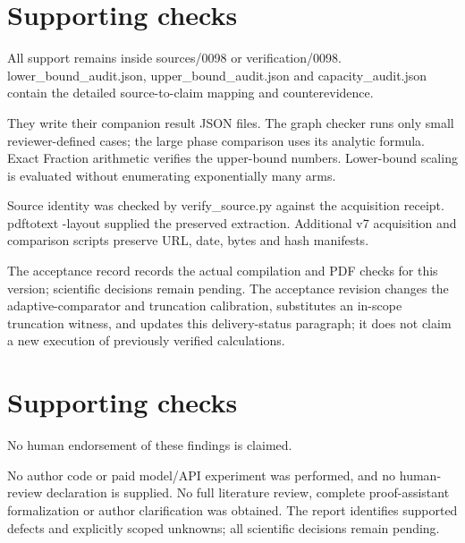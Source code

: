 \documentclass[10pt]{article}
\begin{document}
\section*{Supporting checks}
All support remains inside sources/0098 or verification/0098. lower\_bound\_audit.json, upper\_bound\_audit.json and capacity\_audit.json contain the detailed source-to-claim mapping and counterevidence.\par
They write their companion result JSON files. The graph checker runs only small reviewer-defined cases; the large phase comparison uses its analytic formula. Exact Fraction arithmetic verifies the upper-bound numbers. Lower-bound scaling is evaluated without enumerating exponentially many arms.\par
Source identity was checked by verify\_source.py against the acquisition receipt. pdftotext -layout supplied the preserved extraction. Additional v7 acquisition and comparison scripts preserve URL, date, bytes and hash manifests.\par
The acceptance record records the actual compilation and PDF checks for this version; scientific decisions remain pending. The acceptance revision changes the adaptive-comparator and truncation calibration, substitutes an in-scope truncation witness, and updates this delivery-status paragraph; it does not claim a new execution of previously verified calculations.\par
\section*{Supporting checks}
No human endorsement of these findings is claimed.\par
No author code or paid model/API experiment was performed, and no human-review declaration is supplied. No full literature review, complete proof-assistant formalization or author clarification was obtained. The report identifies supported defects and explicitly scoped unknowns; all scientific decisions remain pending.\par
\end{document}
